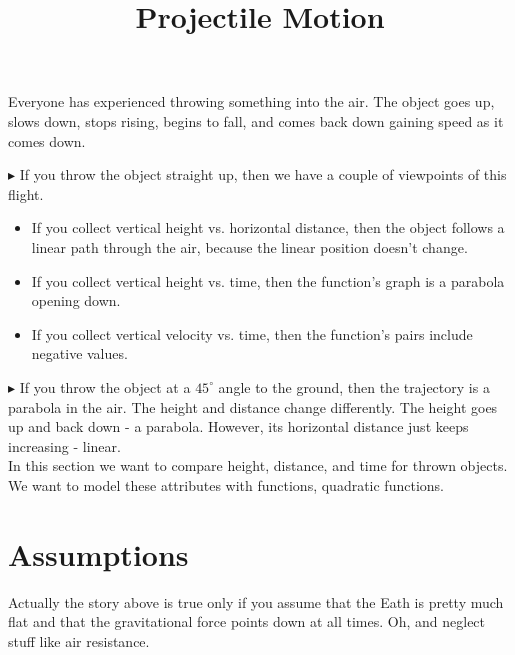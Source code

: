 \documentclass{ximera}
\title{Projectile Motion}
\begin{document}
\begin{abstract}
\end{abstract}
\maketitle



Everyone has experienced throwing something into the air. The object goes up, slows down, stops rising, begins to fall, and comes back down gaining speed as it comes down.  





$\blacktriangleright$ If you throw the object straight up, then we have a couple of viewpoints of this flight. 

\begin{itemize}
\item If you collect vertical height vs. horizontal distance, then the object follows a linear path through the air, because the linear position doesn't change.  
\item If you collect vertical height vs. time, then the function's graph is a parabola opening down.
\item If you collect vertical velocity vs. time, then the function's pairs include negative values.
\end{itemize}




$\blacktriangleright$  If you throw the object at a $45^{\circ}$ angle to the ground, then the trajectory is a parabola in the air.  The height and distance change differently.  The height goes up and back down - a parabola.  However, its horizontal distance just keeps increasing - linear. \\


In this section we want to compare height, distance, and time for thrown objects. \\

We want to model these attributes with functions, quadratic functions.



\section{Assumptions}

Actually the story above is true only if you assume that the Eath is pretty much flat and that the gravitational force points down at all times. Oh, and neglect stuff like air resistance.
\end{document}
